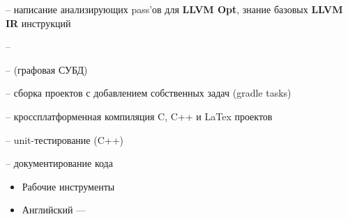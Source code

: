 \documentclass[10pt,a4paper,ragged2e,withhyper]{custom-altacv}
\begin{document}
\begin{paracol}{2}
 -- написание анализирующих pass'ов для \textbf{LLVM Opt}, знание базовых \textbf{LLVM IR} инструкций
\vspace{1ex}

 -- 
\vspace{-.2ex}

 --  (графовая СУБД)
\vspace{1ex}

 -- сборка проектов с добавлением собственных задач (gradle tasks)
\vspace{1ex}

 -- кроссплатформенная компиляция C, C++ и LaTex проектов
\vspace{1ex}

 -- unit-тестирование (C++)
\vspace{1ex}

 -- документирование кода
\vspace{1ex}

\vspace{1ex}

\divider

\begin{itemize}
	\item\textcolor{emphasis}{Рабочие инструменты}
\end{itemize}





\begin{itemize}
	\item Английский --- 
\end{itemize}

\end{paracol}
\end{document}
